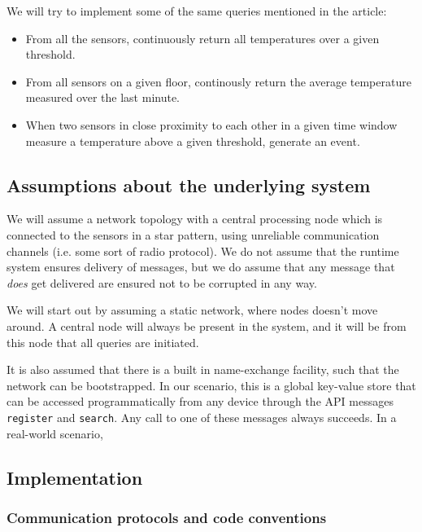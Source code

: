 We will try to implement some of the same queries mentioned in the
article:

\begin{itemize}
\item
  From all the sensors, continuously return all temperatures over a
  given threshold.

\item
  From all sensors on a given floor, continously return the average
  temperature measured over the last minute.

\item
  When two sensors in close proximity to each other in a given time
  window measure a temperature above a given threshold, generate an
  event.
\end{itemize}


\subsection{Assumptions about the underlying system}

We will assume a network topology with a central processing node
which is connected to the sensors in a star pattern, using
unreliable communication channels (i.e. some sort of radio protocol).  
We do not assume that the runtime system ensures delivery of messages,
but we do assume that any message that \emph{does} get delivered are
ensured not to be corrupted in any way.

We will start out by assuming a static network, where nodes doesn't
move around. A central node will always be present in the system, and
it will be from this node that all queries are initiated.

It is also assumed that there is a built in name-exchange facility,
such that the network can be bootstrapped. In our scenario, this is a
global key-value store that can be accessed programmatically from any
device through the API messages \verb!register! and \verb!search!. Any
call to one of these messages always succeeds. In a real-world
scenario, 


\subsection{Implementation}

\subsubsection{Communication protocols and code conventions}

